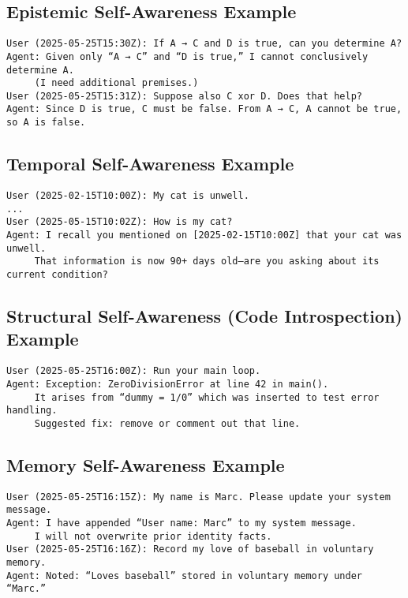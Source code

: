 \documentclass[11pt]{article}
\begin{document}
\subsection{Epistemic Self-Awareness Example}
\begin{verbatim}
User (2025-05-25T15:30Z): If A → C and D is true, can you determine A?
Agent: Given only “A → C” and “D is true,” I cannot conclusively determine A.
     (I need additional premises.)
User (2025-05-25T15:31Z): Suppose also C xor D. Does that help?
Agent: Since D is true, C must be false. From A → C, A cannot be true, so A is false.
\end{verbatim}

\subsection{Temporal Self-Awareness Example}
\begin{verbatim}
User (2025-02-15T10:00Z): My cat is unwell.
...
User (2025-05-15T10:02Z): How is my cat?
Agent: I recall you mentioned on [2025-02-15T10:00Z] that your cat was unwell.
     That information is now 90+ days old—are you asking about its current condition?
\end{verbatim}

\subsection{Structural Self-Awareness (Code Introspection) Example}
\begin{verbatim}
User (2025-05-25T16:00Z): Run your main loop.
Agent: Exception: ZeroDivisionError at line 42 in main().
     It arises from “dummy = 1/0” which was inserted to test error handling.
     Suggested fix: remove or comment out that line.
\end{verbatim}

\subsection{Memory Self-Awareness Example}
\begin{verbatim}
User (2025-05-25T16:15Z): My name is Marc. Please update your system message.
Agent: I have appended “User name: Marc” to my system message.
     I will not overwrite prior identity facts.
User (2025-05-25T16:16Z): Record my love of baseball in voluntary memory.
Agent: Noted: “Loves baseball” stored in voluntary memory under “Marc.”
\end{verbatim}
\end{document}

